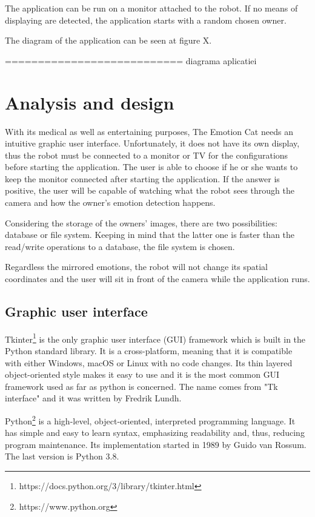 \documentclass[runningheads,a4paper,12pt]{report}
\begin{document}
The application can be run on a monitor attached to the robot. If no means of displaying are detected, the application starts with a random chosen owner. 

The diagram of the application can be seen at figure X.

=========================== diagrama aplicatiei

\section{Analysis and design}
\label{chapter:analysis}
With its medical as well as entertaining purposes, The Emotion Cat needs an intuitive graphic user interface. Unfortunately, it does not have its own display, thus the robot must be connected to a monitor or TV for the configurations before starting the application. The user is able to choose if he or she wants to keep the monitor connected after starting the application. If the answer is positive, the user will be capable of watching what the robot sees through the camera and how the owner's emotion detection happens.

Considering the storage of the owners' images, there are two possibilities: database or file system. Keeping in mind that the latter one is faster than the read/write operations to a database, the file system is chosen. 

Regardless the mirrored emotions, the robot will not change its spatial coordinates and the user will sit in front of the camera while the application runs. 

\subsection{Graphic user interface}
Tkinter\footnote{https://docs.python.org/3/library/tkinter.html} is the only graphic user interface (GUI) framework which is built in the Python standard library. It is a cross-platform, meaning that it is compatible with either Windows, macOS or Linux with no code changes. Its thin layered object-oriented style makes it easy to use and it is the most common GUI framework used as far as python is concerned. The name comes from "Tk interface" and it was written by Fredrik Lundh.  

Python\footnote{https://www.python.org} is a high-level, object-oriented, interpreted programming language. It has simple and easy to learn syntax, emphasizing readability and, thus, reducing program maintenance. Its implementation started in 1989 by Guido van Rossum. The last version is Python 3.8.
\end{document}
